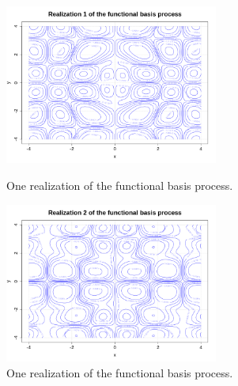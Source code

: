             \begin{figure}[H]
               \begin{minipage}{9cm}
                 \begin{center}
                   \includegraphics[width=7cm]{Figures/continuousReal1.png}
                   \caption{One realization of the functional basis process.}
                   \label{continuousReal1}
                 \end{center}
               \end{minipage}
               \hfill
               \begin{minipage}{9cm}
                 \begin{center}
                   \includegraphics[width=7cm]{Figures/continuousReal2.png}
                   \caption{One realization of the functional basis process.}
                   \label{continuousReal2}
                 \end{center}
               \end{minipage}
             \end{figure}


